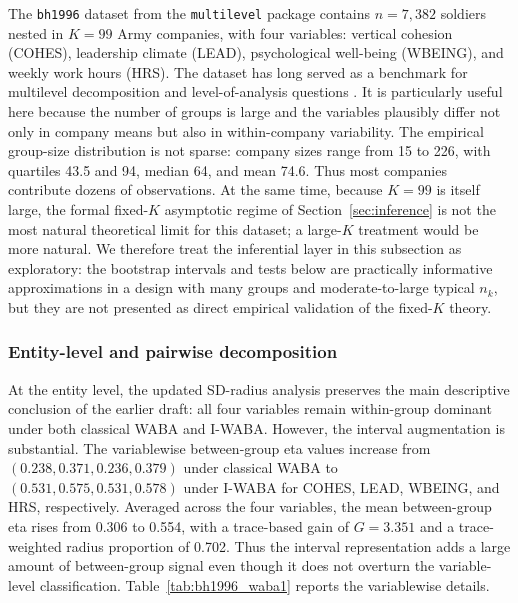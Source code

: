 \documentclass[preprint, times, 12pt, authoryear]{elsarticle}
\begin{document}
The \texttt{bh1996} dataset from the \texttt{multilevel} package \citep{Bliese2000pkg} contains $n=7{,}382$ soldiers nested in $K=99$ Army companies, with four variables: vertical cohesion (COHES), leadership climate (LEAD), psychological well-being (WBEING), and weekly work hours (HRS). The dataset has long served as a benchmark for multilevel decomposition and level-of-analysis questions \citep{bliese1996individual,bliese2002benchmarking}. It is particularly useful here because the number of groups is large and the variables plausibly differ not only in company means but also in within-company variability. The empirical group-size distribution is not sparse: company sizes range from 15 to 226, with quartiles 43.5 and 94, median 64, and mean 74.6. Thus most companies contribute dozens of observations. At the same time, because $K=99$ is itself large, the formal fixed-$K$ asymptotic regime of Section~\ref{sec:inference} is not the most natural theoretical limit for this dataset; a large-$K$ treatment would be more natural. We therefore treat the inferential layer in this subsection as exploratory: the bootstrap intervals and tests below are practically informative approximations in a design with many groups and moderate-to-large typical $n_k$, but they are not presented as direct empirical validation of the fixed-$K$ theory.

\subsubsection{Entity-level and pairwise decomposition}

At the entity level, the updated SD-radius analysis preserves the main descriptive conclusion of the earlier draft: all four variables remain within-group dominant under both classical WABA and I-WABA. However, the interval augmentation is substantial. The variablewise between-group eta values increase from $(0.238, 0.371, 0.236, 0.379)$ under classical WABA to $(0.531, 0.575, 0.531, 0.578)$ under I-WABA for COHES, LEAD, WBEING, and HRS, respectively. Averaged across the four variables, the mean between-group eta rises from 0.306 to 0.554, with a trace-based gain of $G=3.351$ and a trace-weighted radius proportion of 0.702. Thus the interval representation adds a large amount of between-group signal even though it does not overturn the variable-level classification. Table~\ref{tab:bh1996_waba1} reports the variablewise details.
\end{document}
